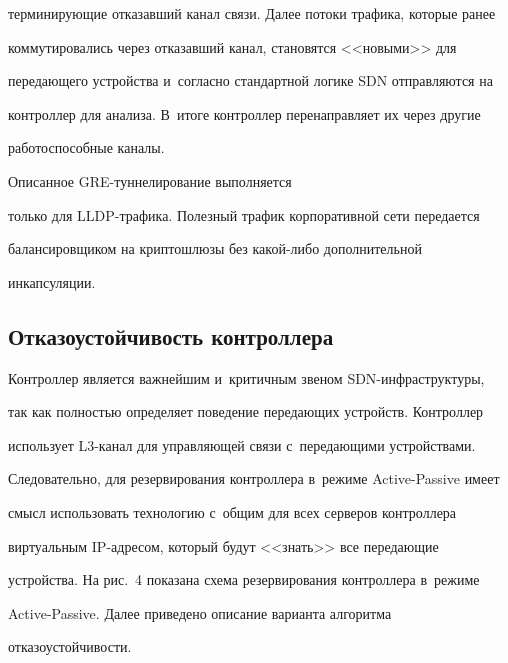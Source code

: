 терминирующие отказавший канал связи. Далее потоки трафика, которые ранее 


коммутировались через отказавший канал, становятся <<новыми>> для 


передающего устройства и~согласно стандартной логике SDN отправляются на 


контроллер для анализа. В~итоге контроллер перенаправляет их через другие 


работоспособные каналы. 





Описанное GRE-тун\-не\-ли\-ро\-ва\-ние выполняется 


только для LLDP-тра\-фи\-ка. Полезный трафик корпоративной сети передается 


балансировщиком на криптошлюзы без ка\-кой-ли\-бо дополнительной 


инкапсуляции.


  


\subsection{Отказоустойчивость контроллера}


  


  Контроллер является важнейшим и~критичным звеном SDN-ин\-фра\-струк\-ту\-ры, 


так как полностью определяет поведение передающих устройств. Контроллер 


использует L3-ка\-нал для управляющей связи с~передающими устройствами. 


Следовательно, для резервирования контроллера в~режиме Active-Passive имеет 


смысл использовать технологию с~общим для всех серверов контроллера 


виртуальным IP-ад\-ре\-сом, который будут <<знать>> все передающие 


устройства. На рис.~4 показана схема резервирования контроллера в~режиме 


Active-Passive. Далее приведено описание варианта алгоритма 


отказоустойчивости.






